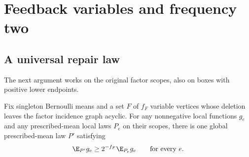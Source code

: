 \section{Feedback variables and frequency two}\label{sec:frequency}
\subsection{A universal repair law}
The next argument works on the original factor scopes, also on boxes with
positive lower endpoints.

\begin{lemma}\label{lem:feedback-repair}
Fix singleton Bernoulli means and a set $F$ of $f_F$ variable vertices
whose deletion leaves the factor incidence graph acyclic. For any nonnegative local functions $g_e$ and any prescribed-mean
local laws $P_e$ on their scopes, there is one global prescribed-mean law
$P'$ satisfying
\[
 \E_{P'}g_e\ge2^{-f_F}\E_{P_e}g_e\qquad\hbox{for every }e.
\]
\end{lemma}
